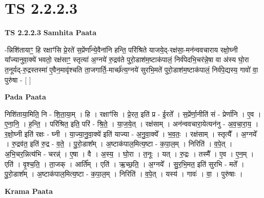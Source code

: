 \documentclass[17pt]{extarticle}
\begin{document}
\section{ TS 2.2.2.3 }

\textbf{TS 2.2.2.3 } \newline
\textbf{Samhita Paata} \newline

-न्निशि॑तायाꣳ॒॒ हि रक्षाꣳ॑सि प्रे॒रते॑ स॒प्रेंर्णा᳚न्ये॒वैना॑नि हन्ति॒ परि॑श्रिते याजये॒द्-रक्ष॑सा॒-मन॑न्ववचाराय रक्षो॒घ्नी या᳚ज्यानुवा॒क्ये॑ भवतो॒ रक्ष॑साꣳ॒॒ स्तृत्या॑ अ॒ग्नये॑ रु॒द्रव॑ते पुरो॒डाश॑म॒ष्टाक॑पालं॒ निर्व॑पेदभि॒चर॑न्ने॒षा वा अ॑स्य घो॒रा त॒नूर्यद्-रु॒द्रस्तस्मा॑ ए॒वैन॒मावृ॑श्चति ता॒जगार्ति॒-मार्च्छ॑त्य॒ग्नये॑ सुरभि॒मते॑ पुरो॒डाश॑म॒ष्टाक॑पालं॒ निर्व॑पे॒द्यस्य॒ गावो॑ वा॒ पुरु॑षा - [  ] \newline

\textbf{Pada Paata} \newline

निशि॑ताया॒मिति॒ नि - शि॒ता॒या॒म् । हि । रक्षाꣳ॑सि । प्रे॒रत॒ इति॑ प्र - ई॒रते᳚ । स॒प्रेंर्णा॒नीति॑ सं - प्रेर्णा॑नि । ए॒व । ए॒ना॒नि॒ । ह॒न्ति॒ । परि॑श्रित॒ इति॒ परि॑ - श्रि॒ते॒ । या॒ज॒ये॒त् । रक्ष॑साम् । अन॑न्ववचारा॒येत्यन॑नु - अ॒व॒चा॒रा॒य॒ । र॒क्षो॒घ्नी इति॑ रक्षः - घ्नी । या॒ज्या॒नु॒वा॒क्ये॑ इति॑ याज्या - अ॒नु॒वा॒क्ये᳚ । भ॒व॒तः॒ । रक्ष॑साम् । स्तृत्यै᳚ । अ॒ग्नये᳚ । रु॒द्रव॑त॒ इति॑ रु॒द्र - व॒ते॒ । पु॒रो॒डाश᳚म् । अ॒ष्टाक॑पाल॒मित्य॒ष्टा - क॒पा॒ल॒म् । निरिति॑ । व॒पे॒त् । अ॒भि॒चर॒न्नित्य॑भि - चरन्न्॑ । ए॒षा । वै । अ॒स्य॒ । घो॒रा । त॒नूः । यत् । रु॒द्रः । तस्मै᳚ । ए॒व । ए॒न॒म् । एति॑ । वृ॒श्च॒ति॒ । ता॒जक् । आर्ति᳚म् । एति॑ । ऋ॒च्छ॒ति॒ । अ॒ग्नये᳚ । सु॒र॒भि॒मत॒ इति॑ सुरभि - मते᳚ । पु॒रो॒डाश᳚म् । अ॒ष्टाक॑पाल॒मित्य॒ष्टा - क॒पा॒ल॒म् । निरिति॑ । व॒पे॒त् । यस्य॑ । गावः॑ । वा॒ । पुरु॑षाः ।  \newline


\textbf{Krama Paata} \newline
\end{document}

